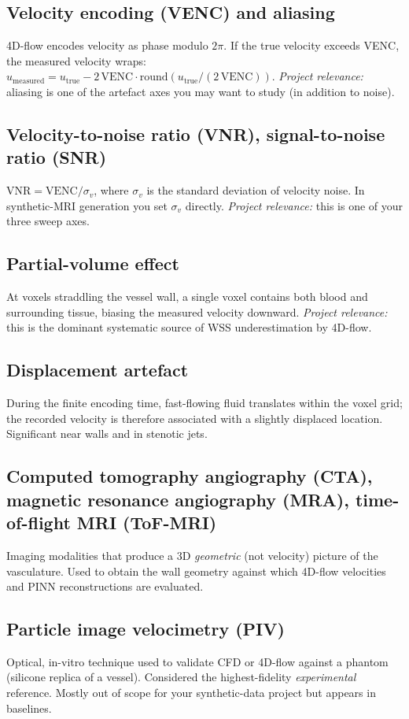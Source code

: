 \documentclass[11pt]{article}
\begin{document}
\subsection*{Velocity encoding (VENC) and aliasing}
4D-flow encodes velocity as phase modulo $2\pi$. If the true velocity exceeds VENC, the measured velocity wraps: $u_{\text{measured}} = u_{\text{true}} - 2\,\mathrm{VENC}\cdot\mathrm{round}(u_{\text{true}}/(2\,\mathrm{VENC}))$. \textit{Project relevance:} aliasing is one of the artefact axes you may want to study (in addition to noise).

\subsection*{Velocity-to-noise ratio (VNR), signal-to-noise ratio (SNR)}
$\mathrm{VNR} = \mathrm{VENC}/\sigma_v$, where $\sigma_v$ is the standard deviation of velocity noise. In synthetic-MRI generation you set $\sigma_v$ directly. \textit{Project relevance:} this is one of your three sweep axes.

\subsection*{Partial-volume effect}
At voxels straddling the vessel wall, a single voxel contains both blood and surrounding tissue, biasing the measured velocity downward. \textit{Project relevance:} this is the dominant systematic source of WSS underestimation by 4D-flow.

\subsection*{Displacement artefact}
During the finite encoding time, fast-flowing fluid translates within the voxel grid; the recorded velocity is therefore associated with a slightly displaced location. Significant near walls and in stenotic jets.

\subsection*{Computed tomography angiography (CTA), magnetic resonance angiography (MRA), time-of-flight MRI (ToF-MRI)}
Imaging modalities that produce a 3D \emph{geometric} (not velocity) picture of the vasculature. Used to obtain the wall geometry against which 4D-flow velocities and PINN reconstructions are evaluated.

\subsection*{Particle image velocimetry (PIV)}
Optical, in-vitro technique used to validate CFD or 4D-flow against a phantom (silicone replica of a vessel). Considered the highest-fidelity \emph{experimental} reference. Mostly out of scope for your synthetic-data project but appears in baselines.
\end{document}
